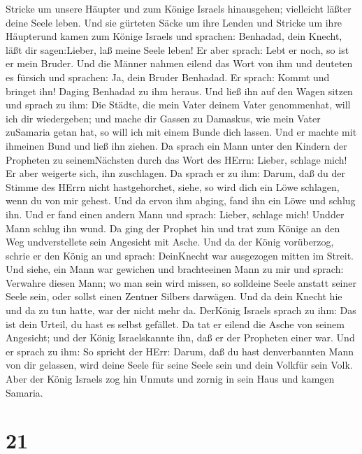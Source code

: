 Stricke um unsere Häupter und zum Könige Israels hinausgehen; vielleicht
läßter deine Seele leben.  Und sie gürteten Säcke um ihre
Lenden und Stricke um ihre Häupterund kamen zum Könige Israels und
sprachen: Benhadad, dein Knecht, läßt dir sagen:Lieber, laß meine Seele
leben! Er aber sprach: Lebt er noch, so ist er mein Bruder.
 Und die Männer nahmen eilend das Wort von ihm und deuteten
es fürsich und sprachen: Ja, dein Bruder Benhadad. Er sprach: Kommt und
bringet ihn! Daging Benhadad zu ihm heraus. Und ließ ihn auf den Wagen
sitzen  und sprach zu ihm: Die Städte, die mein Vater
deinem Vater genommenhat, will ich dir wiedergeben; und mache dir Gassen
zu Damaskus, wie mein Vater zuSamaria getan hat, so will ich mit einem
Bunde dich lassen. Und er machte mit ihmeinen Bund und ließ ihn ziehen.
 Da sprach ein Mann unter den Kindern der Propheten zu
seinemNächsten durch das Wort des HErrn: Lieber, schlage mich! Er aber
weigerte sich, ihn zuschlagen.  Da sprach er zu ihm: Darum,
daß du der Stimme des HErrn nicht hastgehorchet, siehe, so wird dich ein
Löwe schlagen, wenn du von mir gehest. Und da ervon ihm abging, fand ihn
ein Löwe und schlug ihn.  Und er fand einen andern Mann und
sprach: Lieber, schlage mich! Undder Mann schlug ihn wund. 
Da ging der Prophet hin und trat zum Könige an den Weg undverstellete
sein Angesicht mit Asche.  Und da der König vorüberzog,
schrie er den König an und sprach: DeinKnecht war ausgezogen mitten im
Streit. Und siehe, ein Mann war gewichen und brachteeinen Mann zu mir
und sprach: Verwahre diesen Mann; wo man sein wird missen, so solldeine
Seele anstatt seiner Seele sein, oder sollst einen Zentner Silbers
darwägen.  Und da dein Knecht hie und da zu tun hatte, war
der nicht mehr da. DerKönig Israels sprach zu ihm: Das ist dein Urteil,
du hast es selbst gefället.  Da tat er eilend die Asche von
seinem Angesicht; und der König Israelskannte ihn, daß er der Propheten
einer war.  Und er sprach zu ihm: So spricht der HErr:
Darum, daß du hast denverbannten Mann von dir gelassen, wird deine Seele
für seine Seele sein und dein Volkfür sein Volk.  Aber der
König Israels zog hin Unmuts und zornig in sein Haus und kamgen Samaria.

\hypertarget{section-20}{%
\section{21}\label{section-20}}

